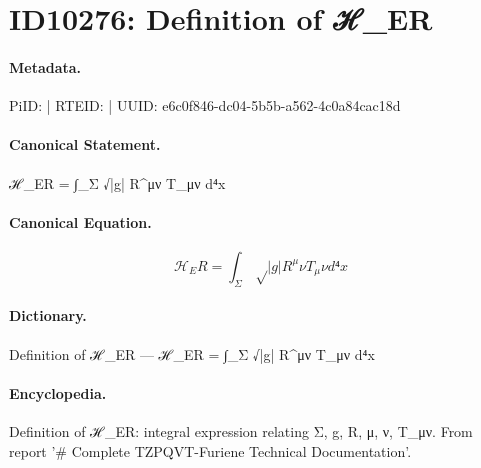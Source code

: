 \section*{ID10276: Definition of ℋ\_ER}
\paragraph{Metadata.}
PiID:  | RTEID:  | UUID: e6c0f846-dc04-5b5b-a562-4c0a84cac18d

\paragraph{Canonical Statement.}
ℋ\_ER = ∫\_Σ √|g| R\textasciicircum{}μν T\_μν d⁴x

\paragraph{Canonical Equation.}
\[
ℋ_ER = ∫_Σ √|g| R^μν T_μν d⁴x
\]

\paragraph{Dictionary.}
Definition of ℋ\_ER — ℋ\_ER = ∫\_Σ √|g| R\textasciicircum{}μν T\_μν d⁴x

\paragraph{Encyclopedia.}
Definition of ℋ\_ER: integral expression relating Σ, g, R, μ, ν, T\_μν. From report '\# Complete TZPQVT-Furiene Technical Documentation'.

